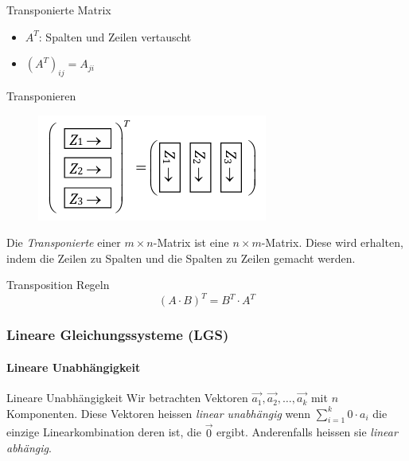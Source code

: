     \begin{definition}{Transponierte Matrix}
        \begin{itemize}
            \item $A^T$: Spalten und Zeilen vertauscht
            \item $(A^T)_{ij} = A_{ji}$
        \end{itemize}
    \end{definition}
    
    \begin{definition}{Transponieren}
        \begin{figure}
            \vspace{-13pt}
            \includegraphics[width=0.9\linewidth]{mat-transpos.png}
        \end{figure}
        Die \textit{Transponierte} einer $m\times n$-Matrix ist eine $n\times m$-Matrix. 
        Diese wird erhalten, indem die Zeilen zu Spalten und die Spalten zu Zeilen gemacht werden.
    \end{definition}

    \begin{theorem}{Transposition Regeln}
        \begin{equation*}
            {(A\cdot B)}^T = B^T\cdot A^T
        \end{equation*}
    \end{theorem}




\subsubsection*{Lineare Gleichungssysteme (LGS)}

\paragraph{Lineare Unabhängigkeit}
    \begin{definition}{Lineare Unabhängigkeit}
        Wir betrachten Vektoren $\vec{a_1},\vec{a_2},\ldots,\vec{a_k}$ mit $n$ Komponenten.
        Diese Vektoren heissen \textit{linear unabhängig} wenn $\sum_{i=1}^k 0\cdot a_i$ die
        einzige Linearkombination deren ist, die $\vec{0}$ ergibt. 
        Anderenfalls heissen sie \textit{linear abhängig}.
    \end{definition}

